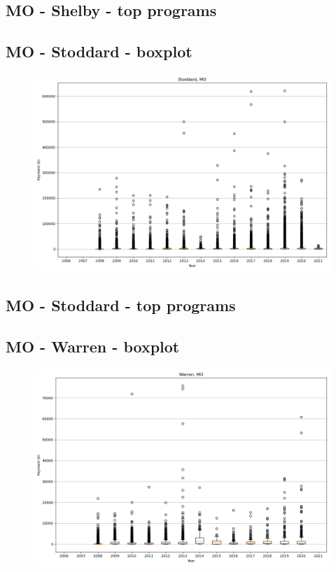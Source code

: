 \subsection*{MO - Shelby - top programs}

\newpage
\subsection*{MO - Stoddard - boxplot}
\begin{figure}[h]
\centering
\includegraphics[width=7in]{../output/boxplots/counties/Stoddard-MO_boxplot.png}
\end{figure}


\subsection*{MO - Stoddard - top programs}

\newpage
\subsection*{MO - Warren - boxplot}
\begin{figure}[h]
\centering
\includegraphics[width=7in]{../output/boxplots/counties/Warren-MO_boxplot.png}
\end{figure}


